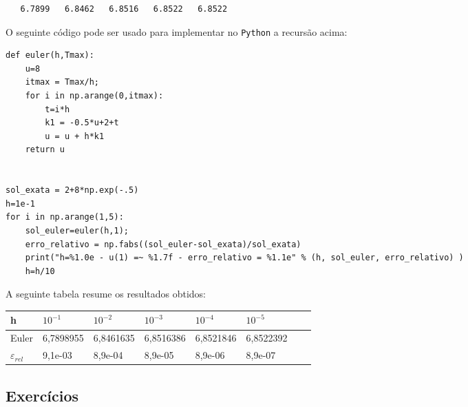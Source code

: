\begin{resol}
\begin{verbatim}
   6.7899   6.8462   6.8516   6.8522   6.8522
\end{verbatim}
\fi


\ifispython
O seguinte código pode ser usado para implementar no \verb+Python+ a recursão acima:

\begin{verbatim}
def euler(h,Tmax):
	u=8
  	itmax = Tmax/h;
	for i in np.arange(0,itmax):
		t=i*h
		k1 = -0.5*u+2+t
		u = u + h*k1
	return u


sol_exata = 2+8*np.exp(-.5)
h=1e-1
for i in np.arange(1,5):
	sol_euler=euler(h,1);
	erro_relativo = np.fabs((sol_euler-sol_exata)/sol_exata)
	print("h=%1.0e - u(1) =~ %1.7f - erro_relativo = %1.1e" % (h, sol_euler, erro_relativo) )
	h=h/10
\end{verbatim}
\fi
A seguinte tabela resume os resultados obtidos:
\begin{center}
 \begin{tabular}{|l|l|l|l|l|l|l|l|}%
\hline
   h&$10^{-1}$&$10^{-2}$&$10^{-3}$&$10^{-4}$&$10^{-5}$\\
   \hline
  Euler & 6,7898955 &  6,8461635  &  6,8516386  &  6,8521846  &  6,8522392  \\
   \hline
   $\varepsilon_{rel}$ &9,1e-03 &  8,9e-04  & 8,9e-05&   8,9e-06 &  8,9e-07\\
    \hline
  \end{tabular}
\end{center}



\end{resol}

\subsection*{Exercícios}


